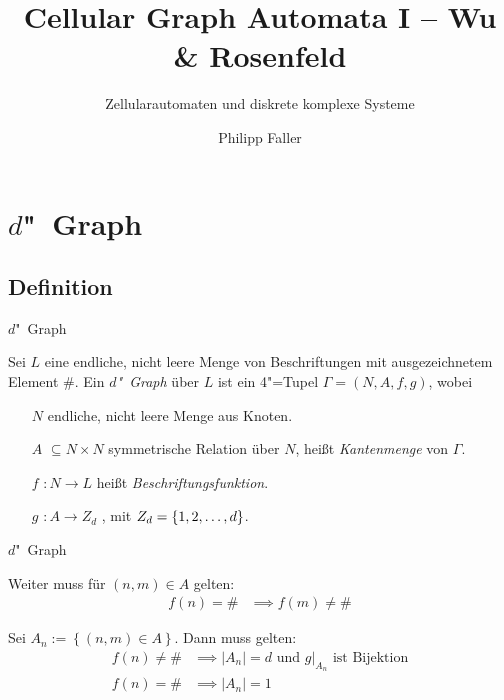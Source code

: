 \documentclass[18pt]{beamer}
\title[Cellular Graph Automata I]{Cellular Graph Automata I -- Wu \& Rosenfeld}
\subtitle{Zellularautomaten und diskrete komplexe Systeme}
\author{Philipp Faller}
\institute{Thomas Worsch}
\newcommand{\defWord}[1]{\emph{#1}}
\begin{document}

\begin{frame}
\titlepage
\end{frame}


\section{$d$"~Graph}
\subsection{Definition}
\begin{frame}{$d$"~Graph}
	\begin{definition}[$d$"~Graph]
		Sei $L$ eine endliche, nicht leere Menge von Beschriftungen mit ausgezeichnetem Element $\#$. 
		Ein \defWord{$d$"~Graph} über $L$ ist ein 4"=Tupel $\Gamma = \left(N, A, f, g\right)$, wobei
		\begin{itemize}
			\item[$N$] endliche, nicht leere Menge aus Knoten. 
			\item[$A$] $\subseteq N \times N$ symmetrische Relation über $N$, heißt \defWord{Kantenmenge} von $\Gamma$.
			\item[$f$] $: N \rightarrow L$  heißt \defWord{Beschriftungsfunktion}.
			\item[$g$] $: A \rightarrow Z_d$ , mit $Z_d = \left \{1, 2,\text{\dots}, d \right \}$. 			
		\end{itemize}
	\end{definition}
\end{frame}

\begin{frame}{$d$"~Graph}
	\begin{definition}
		Weiter muss für $\left(n, m\right) \in A$ gelten:
		\begin{align*}
			f(n) = \# &\implies f(m) \neq \#
		\end{align*}
		
		Sei $A_n := \left \{\left(n, m\right) \in A\right \}$. Dann muss gelten:
		\begin{align*}
			f(n) \neq \# &\implies  \left|A_n\right| = d \text{ und } g \vert_{A_n} \text{ ist Bijektion} \\
			f(n) = \# &\implies\left|A_n\right| = 1
		\end{align*}
		
	\end{definition}
\end{frame}
\end{document}

